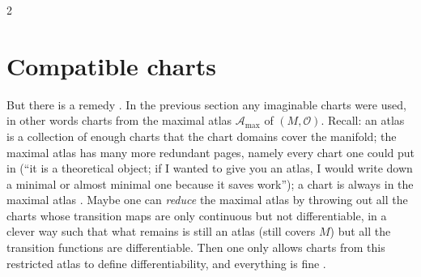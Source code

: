 \begin{paracol}{2}
\section{Compatible charts}\label{sec:c04-compatible}

But there is a remedy . In the previous section any imaginable charts were used, in other words charts from the maximal atlas $\mathcal A_{\max}$ of $(M,\mathcal O)$. Recall: an atlas is a collection of enough charts that the chart domains cover the manifold;
the maximal atlas has many more redundant pages, namely every chart one could put in (``it is a theoretical object; if I wanted to give you an atlas, I would write down a minimal or almost minimal one because it saves work''); a chart is always in the maximal atlas
. Maybe one can \emph{reduce} the maximal atlas by throwing out all the charts whose transition maps are only continuous but not differentiable, in a clever way such that what remains is still an atlas (still covers $M$) but all the
transition functions are differentiable. Then one only allows charts from this restricted atlas to define differentiability, and everything is fine .


\end{paracol}
